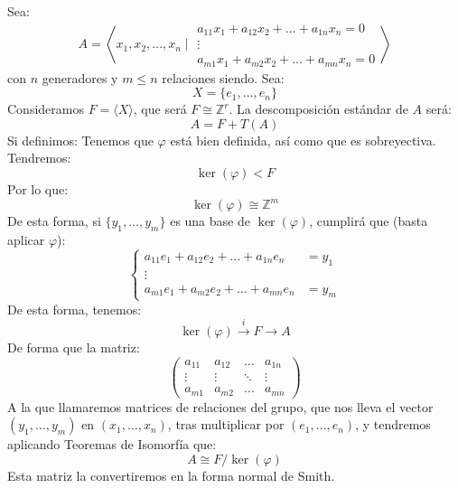 Sea:
\begin{equation*}
    A = \left\langle x_1,x_2,\ldots, x_n \mid \begin{array}{c}
        a_{11}x_1 + a_{12}x_2 + \ldots + a_{1n} x_n = 0 \\
        \vdots \\
        a_{m1}x_1 + a_{m2}x_2 + \ldots + a_{mn} x_n = 0 
    \end{array}\right\rangle 
\end{equation*}
con $n$ generadores y $m\leq n$ relaciones siendo. Sea:
\begin{equation*}
    X = \{e_1, \ldots, e_n\}
\end{equation*}
Consideramos $F = \langle X \rangle $, que será $F\cong \mathbb{Z}^r$. La descomposición estándar de $A$ será:
\begin{equation*}
    A = F + T(A)
\end{equation*}
Si definimos:
Tenemos que $\varphi$ está bien definida, así como que es sobreyectiva. Tendremos:
\begin{equation*}
    \ker(\varphi) < F
\end{equation*}
Por lo que:
\begin{equation*}
    \ker(\varphi) \cong \mathbb{Z}^m
\end{equation*}
De esta forma, si $\{y_1,\ldots,y_m\}$ es una base de $\ker(\varphi)$, cumplirá que (basta aplicar $\varphi$):
\begin{equation*}
    \left\{\begin{array}{rl}
        a_{11}e_1 + a_{12}e_2 + \ldots + a_{1n} e_n &= y_1 \\
        \vdots& \\
        a_{m1}e_1 + a_{m2}e_2 + \ldots + a_{mn} e_n &= y_m 
    \end{array}\right.
\end{equation*}
De esta forma, tenemos:
\begin{equation*}
    \ker(\varphi) \stackrel{i}{\longrightarrow} F \rightarrow A
\end{equation*}
De forma que la matriz:
\begin{equation*}
    \left(\begin{array}{cccc}
        a_{11} & a_{12} & \ldots & a_{1n} \\
        \vdots & \vdots & \ddots & \vdots \\
        a_{m1} & a_{m2} & \ldots & a_{mn} 
    \end{array}\right)
\end{equation*}
A la que llamaremos matrices de relaciones del grupo, que nos lleva el vector $(y_1, \ldots, y_m)$ en $(x_1, \ldots, x_n)$, tras multiplicar por $(e_1, \ldots, e_n)$, y tendremos aplicando Teoremas de Isomorfía que:
\begin{equation*}
    A\cong F/\ker(\varphi)
\end{equation*}
Esta matriz la convertiremos en la forma normal de Smith.\\

